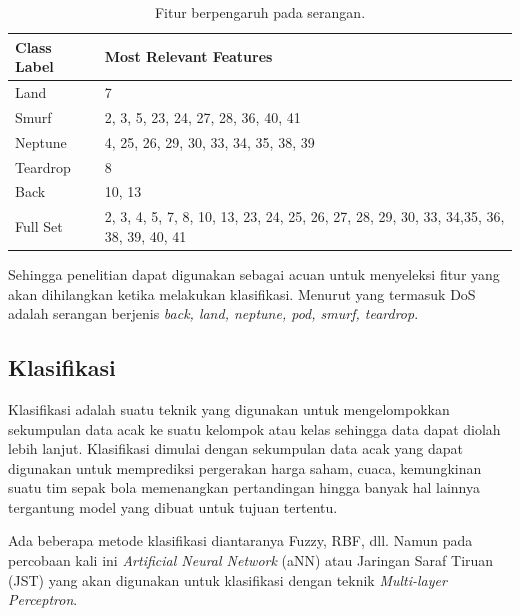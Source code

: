 \begin{table}[h]
\begin{center}
\begin{tabular}{|l|l|}
\hline
Class Label & Most Relevant Features                                                                  \\ \hline
Land        & 7                                                                                       \\ \hline
Smurf       & 2, 3, 5, 23, 24, 27, 28, 36, 40, 41                                                     \\ \hline
Neptune     & 4, 25, 26, 29, 30, 33, 34, 35, 38, 39                                                   \\ \hline
Teardrop    & 8                                                                                       \\ \hline
Back        & 10, 13                                                                                  \\ \hline
Full Set    & 2, 3, 4, 5, 7, 8, 10, 13, 23, 24, 25, 26, 27, 28, 29, 30, 33, 34,35, 36, 38, 39, 40, 41 \\ \hline
\end{tabular}
\caption{\label{tab:table-name}Fitur berpengaruh pada serangan.}
\end{center}
\end{table}

Sehingga penelitian \cite{das_ddos_2019} dapat digunakan sebagai acuan untuk menyeleksi fitur yang akan dihilangkan ketika melakukan klasifikasi. Menurut \cite{kdd99_feature} yang termasuk DoS adalah serangan berjenis \textit{back, land, neptune, pod, smurf, teardrop}.

\subsection{Klasifikasi}
Klasifikasi adalah suatu teknik yang digunakan untuk mengelompokkan sekumpulan data acak ke suatu kelompok atau kelas sehingga data dapat diolah lebih lanjut\cite{klasifikasi}. Klasifikasi dimulai dengan sekumpulan data acak yang dapat digunakan untuk memprediksi pergerakan harga saham, cuaca, kemungkinan suatu tim sepak bola memenangkan pertandingan hingga banyak hal lainnya tergantung model yang dibuat untuk tujuan tertentu.

Ada beberapa metode klasifikasi diantaranya Fuzzy, RBF, dll. Namun pada percobaan kali ini \textit{Artificial Neural Network} (aNN) atau Jaringan Saraf Tiruan (JST) yang akan digunakan untuk klasifikasi dengan teknik \textit{Multi-layer Perceptron}.

